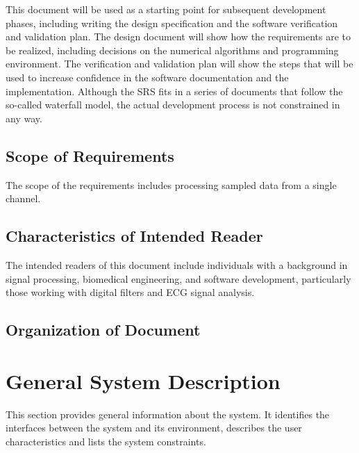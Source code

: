 \documentclass[12pt]{article}
\begin{document}
This document will be used as a starting point for subsequent development
phases, including writing the design specification and the software verification
and validation plan.  The design document will show how the requirements are to
be realized, including decisions on the numerical algorithms and programming
environment.  The verification and validation plan will show the steps that will
be used to increase confidence in the software documentation and the
implementation.  Although the SRS fits in a series of documents that follow the
so-called waterfall model, the actual development process is not constrained in
any way.

\subsection{Scope of Requirements} 

The scope of the requirements includes processing sampled data from a single
channel.

\subsection{Characteristics of Intended Reader} \label{sec_IntendedReader}

The intended readers of this document include individuals with a background in
signal processing, biomedical engineering, and software development,
particularly those working with digital filters and ECG signal analysis.

\subsection{Organization of Document}


\section{General System Description}

This section provides general information about the system.  It identifies the
interfaces between the system and its environment, describes the user
characteristics and lists the system constraints.  
\end{document}
